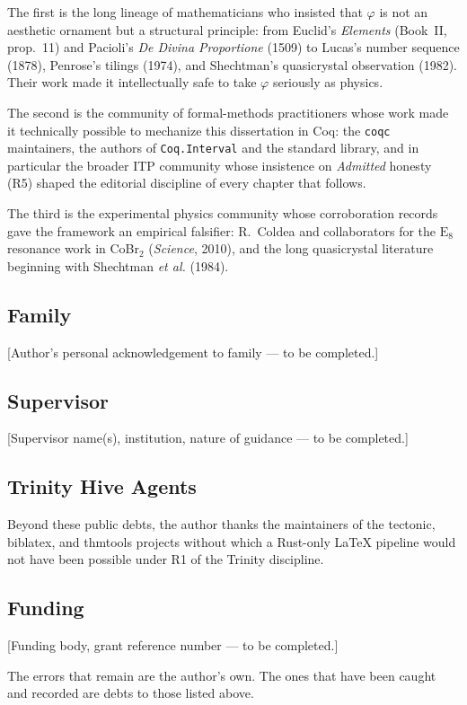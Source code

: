 The first is the long lineage of mathematicians who insisted that
\(\varphi\) is not an aesthetic ornament but a structural principle:
from Euclid's \emph{Elements} (Book~II, prop.~11) and Pacioli's
\emph{De Divina Proportione} (1509) to Lucas's number sequence (1878),
Penrose's tilings (1974), and Shechtman's quasicrystal observation
(1982). Their work made it intellectually safe to take \(\varphi\)
seriously as physics.

The second is the community of formal-methods practitioners whose work
made it technically possible to mechanize this dissertation in Coq:
the \texttt{coqc} maintainers, the authors of \texttt{Coq.Interval}
and the standard library, and in particular the broader ITP community
whose insistence on \emph{Admitted} honesty (R5) shaped the editorial
discipline of every chapter that follows.

The third is the experimental physics community whose corroboration
records gave the framework an empirical falsifier: R.~Coldea and
collaborators for the \(\mathrm{E}_{8}\) resonance work in
CoBr\(_{2}\) (\emph{Science}, 2010), and the long quasicrystal
literature beginning with Shechtman \emph{et al.} (1984).

\subsection*{Family}
[Author's personal acknowledgement to family — to be completed.]

\subsection*{Supervisor}
[Supervisor name(s), institution, nature of guidance — to be completed.]

\subsection*{Trinity Hive Agents}
Beyond these public debts, the author thanks the maintainers of the
\textsf{tectonic}, \textsf{biblatex}, and \textsf{thmtools} projects
without which a Rust-only LaTeX pipeline would not have been possible
under R1 of the Trinity discipline.

\subsection*{Funding}
[Funding body, grant reference number — to be completed.]

\bigskip
The errors that remain are the author's own. The ones that have been
caught and recorded are debts to those listed above.
